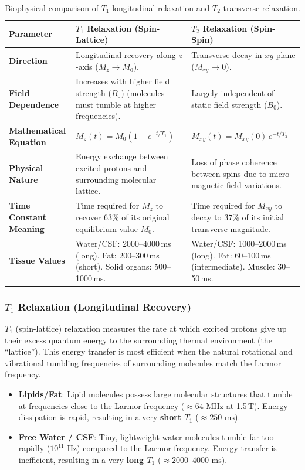 \documentclass[11pt,a4paper]{article}
\begin{document}
\begin{table}[htbp]
\centering
\small
\renewcommand{\arraystretch}{1.3}
\begin{tabular}{p{3.2cm}p{6cm}p{6cm}}
\toprule
\textbf{Parameter} & \textbf{$T_1$ Relaxation (Spin-Lattice)} & \textbf{$T_2$ Relaxation (Spin-Spin)} \\
\midrule
\textbf{Direction} & Longitudinal recovery along $z$-axis ($M_z \to M_0$). & Transverse decay in $xy$-plane ($M_{xy} \to 0$). \\
\textbf{Field Dependence} & Increases with higher field strength ($B_0$) (molecules must tumble at higher frequencies). & Largely independent of static field strength ($B_0$). \\
\textbf{Mathematical Equation} & $M_z(t) = M_0 \left(1 - e^{-t / T_1}\right)$ & $M_{xy}(t) = M_{xy}(0) \, e^{-t / T_2}$ \\
\textbf{Physical Nature} & Energy exchange between excited protons and surrounding molecular lattice. & Loss of phase coherence between spins due to micro-magnetic field variations. \\
\textbf{Time Constant Meaning} & Time required for $M_z$ to recover $63\%$ of its original equilibrium value $M_0$. & Time required for $M_{xy}$ to decay to $37\%$ of its initial transverse magnitude. \\
\textbf{Tissue Values} & Water/CSF: 2000--4000\,ms (long). Fat: 200--300\,ms (short). Solid organs: 500--1000\,ms. & Water/CSF: 1000--2000\,ms (long). Fat: 60--100\,ms (intermediate). Muscle: 30--50\,ms. \\
\bottomrule
\end{tabular}
\caption{Biophysical comparison of $T_1$ longitudinal relaxation and $T_2$ transverse relaxation.}
\label{tab:relaxation_comparison}
\end{table}

\subsubsection{$T_1$ Relaxation (Longitudinal Recovery)}
$T_1$ (spin-lattice) relaxation measures the rate at which excited protons give up their excess quantum energy to the surrounding thermal environment (the ``lattice''). This energy transfer is most efficient when the natural rotational and vibrational tumbling frequencies of surrounding molecules match the Larmor frequency.
\begin{itemize}
    \item \textbf{Lipids/Fat}: Lipid molecules possess large molecular structures that tumble at frequencies close to the Larmor frequency ($\approx 64\text{ MHz}$ at 1.5\,T). Energy dissipation is rapid, resulting in a very \textbf{short $T_1$} ($\approx 250\text{ ms}$).
    \item \textbf{Free Water / CSF}: Tiny, lightweight water molecules tumble far too rapidly ($10^{11}\text{ Hz}$) compared to the Larmor frequency. Energy transfer is inefficient, resulting in a very \textbf{long $T_1$} ($\approx 2000\text{--}4000\text{ ms}$).
\end{itemize}
\end{document}
